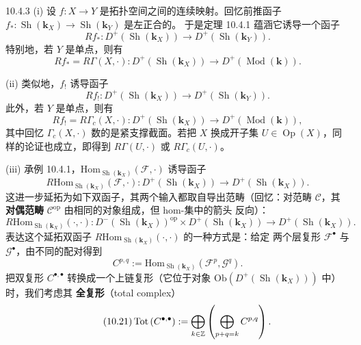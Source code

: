 \begin{wexam}{10.4.3}
(i) 设 $f:X\to Y$ 是拓扑空间之间的连续映射。回忆前推函子
$f_\ast:\operatorname{Sh}(\mathbf{k}_X)\to\operatorname{Sh}(\mathbf{k}_Y)$ 是左正合的。
于是定理 10.4.1 蕴涵它诱导一个函子
\[
Rf_\ast:D^+\left(\operatorname{Sh}(\mathbf{k}_X)\right)
\to D^+\left(\operatorname{Sh}(\mathbf{k}_Y)\right).
\]
特别地，若 $Y$ 是单点，则有
\[
Rf_\ast=R\Gamma(X,\cdot):
D^+\left(\operatorname{Sh}(\mathbf{k}_X)\right)\to D^+\left(\operatorname{Mod}(\mathbf{k})\right).
\]

(ii) 类似地，$f_!$ 诱导函子
\[
Rf_!:D^+\left(\operatorname{Sh}(\mathbf{k}_X)\right)
\to D^+\left(\operatorname{Sh}(\mathbf{k}_Y)\right).
\]
此外，若 $Y$ 是单点，则有
\[
Rf_!=R\Gamma_c(X,\cdot):
D^+\left(\operatorname{Sh}(\mathbf{k}_X)\right)\to
D^+\left(\operatorname{Mod}(\mathbf{k})\right),
\]
其中回忆 $\Gamma_c(X,\cdot)$ 数的是紧支撑截面。若把 $X$ 换成开子集
$U\in\operatorname{Op}(X)$，同样的论证也成立，即得到 $R\Gamma(U,\cdot)$ 或
$R\Gamma_c(U,\cdot)$。

(iii) 承例 10.4.1，$\mathrm{Hom}_{\operatorname{Sh}(\mathbf{k}_X)}
(\mathcal F,\cdot)$ 诱导函子
\[
R\mathrm{Hom}_{\operatorname{Sh}(\mathbf{k}_X)}(\mathcal F,\cdot):
D^+\left(\operatorname{Sh}(\mathbf{k}_X)\right)
\to D^+\left(\operatorname{Sh}(\mathbf{k}_X)\right).
\]
这进一步延拓为如下双函子，其两个输入都取自导出范畴（回忆：对范畴 $\mathcal C$，其
\textbf{对偶范畴} $\mathcal C^{\mathrm{op}}$ 由相同的对象组成，但 hom-集中的箭头
反向）：
\[
R\mathrm{Hom}_{\operatorname{Sh}(\mathbf{k}_X)}(\cdot,\cdot):
D^-\left(\operatorname{Sh}(\mathbf{k}_X)\right)^{\mathrm{op}}\times
D^+\left(\operatorname{Sh}(\mathbf{k}_X)\right)
\to D^+\left(\operatorname{Sh}(\mathbf{k}_X)\right).
\]
表达这个延拓双函子
$R\mathrm{Hom}_{\operatorname{Sh}(\mathbf{k}_X)}(\cdot,\cdot)$ 的一种方式是：给定
两个层复形 $\mathcal F^\bullet$ 与 $\mathcal G^\bullet$，由不同的配对得到
\[
C^{p,q}:=\mathrm{Hom}_{\operatorname{Sh}(\mathbf{k}_X)}
\left(\mathcal F^p,\mathcal G^q\right).
\]
把双复形 $C^{\bullet,\bullet}$ 转换成一个上链复形（它位于对象
$\mathrm{Ob}\left(D^+(\operatorname{Sh}(\mathbf{k}_X))\right)$ 中）时，我们考虑其
\textbf{全复形}（total complex）
\begin{equation}\tag{10.21}
\operatorname{Tot}\left(C^{\bullet,\bullet}\right):=
\bigoplus_{k\in\mathbb{Z}}\left(\bigoplus_{p+q=k}C^{p,q}\right).
\end{equation}


\end{wexam}
